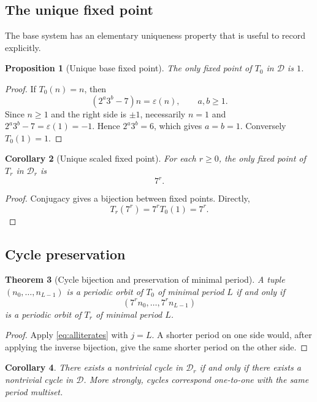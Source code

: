 \documentclass[11pt]{article}
\newtheorem{theorem}{Theorem}[section]
\newtheorem{proposition}[theorem]{Proposition}
\newtheorem{corollary}[theorem]{Corollary}
\newcommand{\eps}{\varepsilon}
\begin{document}
\subsection{The unique fixed point}
The base system has an elementary uniqueness property that is useful to record explicitly.

\begin{proposition}[Unique base fixed point]
The only fixed point of $T_0$ in $\mathcal D$ is $1$.
\end{proposition}
\begin{proof}
If $T_0(n)=n$, then
\[
(2^a3^b-7)n=\eps(n),\qquad a,b\ge1.
\]
Since $n\ge1$ and the right side is $\pm1$, necessarily $n=1$ and $2^a3^b-7=\eps(1)=-1$. Hence $2^a3^b=6$, which gives $a=b=1$. Conversely $T_0(1)=1$.
\end{proof}

\begin{corollary}[Unique scaled fixed point]
For each $r\ge0$, the only fixed point of $T_r$ in $\mathcal D_r$ is
\begin{equation}
7^r.
\label{eq:fixedscaled}
\end{equation}
\end{corollary}
\begin{proof}
Conjugacy gives a bijection between fixed points. Directly,
\[
T_r(7^r)=7^rT_0(1)=7^r.
\]
\end{proof}

\subsection{Cycle preservation}
\begin{theorem}[Cycle bijection and preservation of minimal period]
A tuple $(n_0,\ldots,n_{L-1})$ is a periodic orbit of $T_0$ of minimal period $L$ if and only if
\begin{equation}
(7^rn_0,\ldots,7^rn_{L-1})
\label{eq:scaledcycle}
\end{equation}
is a periodic orbit of $T_r$ of minimal period $L$.
\end{theorem}
\begin{proof}
Apply \eqref{eq:alliterates} with $j=L$. A shorter period on one side would, after applying the inverse bijection, give the same shorter period on the other side.
\end{proof}

\begin{corollary}
There exists a nontrivial cycle in $\mathcal D_r$ if and only if there exists a nontrivial cycle in $\mathcal D$. More strongly, cycles correspond one-to-one with the same period multiset.
\end{corollary}
\end{document}
